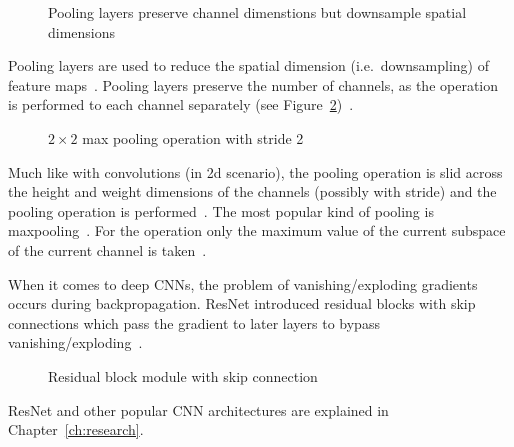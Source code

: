 \begin{figure}[h]
    \centering
    \caption[Channel dimension preserving of pooling layers]{%
        Pooling layers preserve channel dimenstions but downsample spatial
        dimensions\label{fig:pool-layer}
    }
\end{figure}
Pooling layers are used to reduce the spatial dimension (i.e.\ downsampling) of feature
maps~\citep{ponti_everything_2017}.
Pooling layers preserve the number of channels, as the operation is performed to each channel
separately (see Figure~\ref{fig:pool-layer})~\citep{chauhan_review_2018}.
\begin{figure}[ht]
    \centering
    \caption[Visualization of a max pooling operation]{$2\times 2$ max pooling operation with stride
        2~\citep{chauhan_review_2018}\label{fig:pool-layer}}
\end{figure}
Much like with convolutions (in 2d scenario), the pooling operation is slid across the height and
weight dimensions of the channels (possibly with stride) and the pooling operation is
performed~\citep{ponti_everything_2017,chauhan_review_2018}.
The most popular kind of pooling is maxpooling~\citep{ponti_everything_2017}.
For the operation only the maximum value of the current subspace of the current channel is
taken~\citep{chauhan_review_2018}.

When it comes to deep \acp{CNN}, the problem of vanishing/exploding gradients occurs during
backpropagation.
ResNet introduced residual blocks with skip connections which pass the gradient to later layers
to bypass vanishing/exploding~\citep{he_deep_2015}.
\begin{figure}[ht]
    \centering
    \caption[Skip connection introduced by residual blocks]{%
        Residual block module with skip
        connection~\citep{he_deep_2015}\label{fig:skip-conn}
    }
\end{figure}
ResNet and other popular \ac{CNN} architectures are explained in Chapter~\ref{ch:research}.


